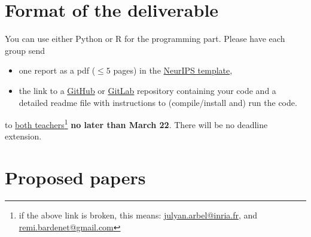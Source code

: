 \documentclass[12pt]{article}%
\begin{document}
\section{Format of the deliverable}
You can use either Python or R for the programming part. Please have each group send
\begin{itemize}
\item one report as a pdf ($\leq 5$ pages) in the \href{https://www.overleaf.com/latex/templates/neurips-2020/mnshsmqkjsqz}{NeurIPS template},
\item the link to a \href{https://github.com/}{GitHub} or  \href{https://about.gitlab.com/}{GitLab} repository containing your code and a detailed readme file with
  instructions to (compile/install and) run the code.
\end{itemize} to \href{mailto:julyan.arbel@inria.fr,remi.bardenet@gmail.com}{both teachers}\footnote{if the above link is broken, this means: \href{mailto:julyan.arbel@inria.fr}{julyan.arbel@inria.fr}, and \href{mailto:remi.bardenet@gmail.com}{remi.bardenet@gmail.com}} {\bf no later than March 22}. There will be no deadline extension.\\

\section{Proposed papers}
\label{s:papers}


\end{document}
